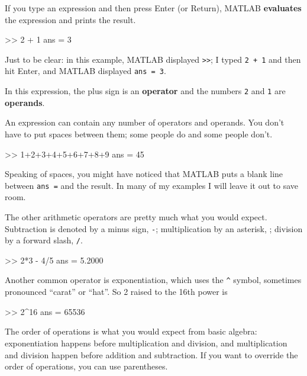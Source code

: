 \documentclass[
]{book}
\numberwithin{Answer}{chapter}
\numberwithin{Exercise}{chapter}
\begin{document}

If you type an expression and then press Enter (or Return), MATLAB
{\bf evaluates} the expression and prints the result.

\begin{code}
>> 2 + 1
ans = 3
\end{code}

Just to be clear: in this example, MATLAB displayed {\tt >>}; I
typed {\tt 2 + 1} and then hit Enter, and MATLAB displayed {\tt ans = 3}.


In this expression, the plus sign is an {\bf operator} and the numbers {\tt 2} and {\tt 1} are {\bf operands}.

An expression can contain any number of operators and operands.  You
don't have to put spaces between them; some people do and some people
don't.

\begin{code}
>> 1+2+3+4+5+6+7+8+9
ans = 45
\end{code}

Speaking of spaces, you might have noticed that MATLAB puts a blank
line between {\tt ans =} and the result.  In many of my examples I will leave it out to save room.


The other arithmetic operators are pretty much what you would expect.
Subtraction is denoted by a minus sign, {\tt -}; multiplication by
an asterisk, {\tt *}; division by a forward slash, {\tt /}.

\begin{code}
>> 2*3 - 4/5
ans = 5.2000
\end{code}

Another common operator is exponentiation, which uses the \verb+^+
symbol, sometimes pronounced ``carat'' or ``hat''.  So 2 raised to the
16th power is

\begin{code}
>> 2^16
ans = 65536
\end{code}

The order of operations is what you would expect from basic algebra:
exponentiation happens before multiplication and division, and multiplication and division happen before addition and subtraction.
If you want to override the order of operations, you can use parentheses.

\end{document}
